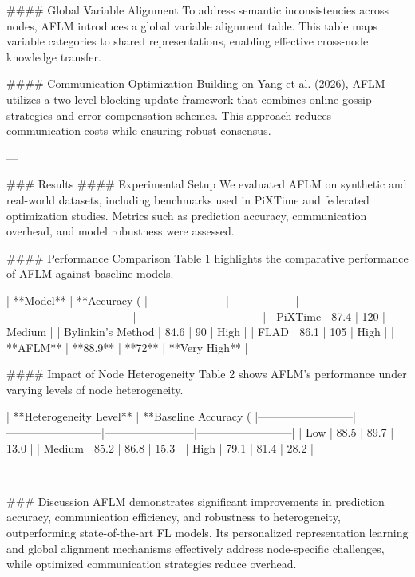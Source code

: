 #### Global Variable Alignment
To address semantic inconsistencies across nodes, AFLM introduces a global variable alignment table. This table maps variable categories to shared representations, enabling effective cross-node knowledge transfer.

#### Communication Optimization
Building on Yang et al. (2026), AFLM utilizes a two-level blocking update framework that combines online gossip strategies and error compensation schemes. This approach reduces communication costs while ensuring robust consensus.

---

### Results
#### Experimental Setup
We evaluated AFLM on synthetic and real-world datasets, including benchmarks used in PiXTime and federated optimization studies. Metrics such as prediction accuracy, communication overhead, and model robustness were assessed.

#### Performance Comparison
Table 1 highlights the comparative performance of AFLM against baseline models.

| **Model**          | **Accuracy (%
|---------------------|------------------|----------------------------------|----------------------------------|
| PiXTime            | 87.4             | 120                              | Medium                          |
| Bylinkin's Method  | 84.6             | 90                               | High                            |
| FLAD               | 86.1             | 105                              | High                            |
| **AFLM**           | **88.9**         | **72**                           | **Very High**                   |

#### Impact of Node Heterogeneity
Table 2 shows AFLM's performance under varying levels of node heterogeneity.

| **Heterogeneity Level** | **Baseline Accuracy (%
|--------------------------|--------------------------|------------------------|--------------------------|
| Low                     | 88.5                     | 89.7                  | 13.0                     |
| Medium                  | 85.2                     | 86.8                  | 15.3                     |
| High                    | 79.1                     | 81.4                  | 28.2                     |

---

### Discussion
AFLM demonstrates significant improvements in prediction accuracy, communication efficiency, and robustness to heterogeneity, outperforming state-of-the-art FL models. Its personalized representation learning and global alignment mechanisms effectively address node-specific challenges, while optimized communication strategies reduce overhead.

